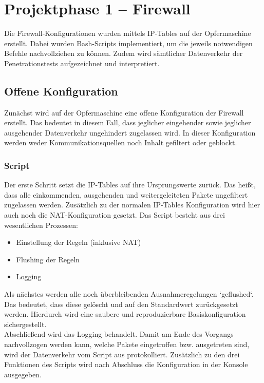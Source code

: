 \chapter{Projektphase 1 – Firewall}
Die Firewall-Konfigurationen wurden mittels IP-Tables auf der Opfermaschine erstellt. Dabei wurden Bash-Scripts implementiert, um die jeweils notwendigen Befehle nachvollziehen zu können. Zudem wird sämtlicher Datenverkehr der Penetrationstests aufgezeichnet und interpretiert. 

\section{Offene Konfiguration}

Zunächst wird auf der Opfermaschine eine offene Konfiguration der Firewall erstellt. Das bedeutet in diesem Fall, dass jeglicher eingehender sowie jeglicher ausgehender Datenverkehr ungehindert zugelassen wird. In dieser Konfiguration werden weder Kommunikationsquellen noch Inhalt gefiltert oder geblockt.

\subsection{Script}
Der erste Schritt setzt die IP-Tables auf ihre Ursprungswerte zurück. Das heißt, dass alle einkommenden, ausgehenden und weitergeleiteten Pakete ungefiltert zugelassen werden. Zusätzlich zu der normalen IP-Tables Konfiguration wird hier auch noch die NAT-Konfiguration gesetzt.  
Das Script besteht aus drei wesentlichen Prozessen: 
\begin{itemize}
	\item Einstellung der Regeln (inklusive NAT)
	\item Flushing der Regeln
	\item Logging
\end{itemize} 

Als nächstes werden alle noch überbleibenden Ausnahmeregelungen `geflushed`. Das bedeutet, dass diese gelöscht und auf den Standardwert zurückgesetzt werden. Hierdurch wird eine saubere und reproduzierbare Basiskonfiguration sichergestellt.\\
Abschließend wird das Logging behandelt. Damit am Ende des Vorgangs nachvollzogen werden kann, welche Pakete eingetroffen bzw. ausgetreten sind, wird der Datenverkehr vom Script aus protokolliert.
Zusätzlich zu den drei Funktionen des Scripts wird nach Abschluss die Konfiguration in der Konsole ausgegeben.

